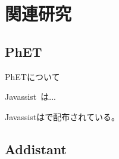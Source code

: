 \chapter{関連研究}

\section{PhET}

PhET\cite{PhET}について

Javassist~\cite{Chiba2000,Chiba2001a}は...

Javassistは\cite{Javassist}で配布されている。

\section{Addistant}

